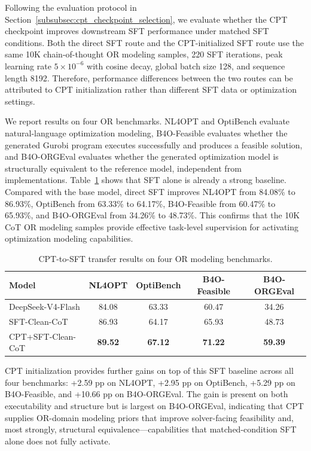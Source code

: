 Following the evaluation protocol in Section~\ref{subsubsec:cpt_checkpoint_selection}, we evaluate whether the CPT checkpoint improves downstream SFT performance under matched SFT conditions. Both the direct SFT route and the CPT-initialized SFT route use the same 10K chain-of-thought OR modeling samples, 220 SFT iterations, peak learning rate \(5\times10^{-6}\) with cosine decay, global batch size 128, and sequence length 8192. Therefore, performance differences between the two routes can be attributed to CPT initialization rather than different SFT data or optimization settings.

We report results on four OR benchmarks. NL4OPT and OptiBench evaluate natural-language optimization modeling, B4O-Feasible evaluates whether the generated Gurobi program executes successfully and produces a feasible solution, and B4O-ORGEval evaluates whether the generated optimization model is structurally equivalent to the reference model, independent from implementations. Table~\ref{tab:cpt_sft_transfer} 
shows that SFT alone is already a strong baseline. Compared with the base model, direct SFT improves NL4OPT from 84.08\% to 86.93\%, OptiBench from 63.33\% to 64.17\%, B4O-Feasible from 60.47\% to 65.93\%, and B4O-ORGEval from 34.26\% to 48.73\%. This confirms that the 10K CoT OR modeling samples provide effective task-level supervision for activating optimization modeling capabilities.

\begin{table}[t]
\centering
\small
\caption{CPT-to-SFT transfer results on four OR modeling benchmarks.}
\begin{tabular}{lcccc}
\toprule
Model & NL4OPT & OptiBench & B4O-Feasible & B4O-ORGEval \\
\midrule
DeepSeek-V4-Flash
    & 84.08 & 63.33 & 60.47 & 34.26 \\
SFT-Clean-CoT
    & 86.93 & 64.17 & 65.93 & 48.73 \\
CPT+SFT-Clean-CoT
    & \textbf{89.52} & \textbf{67.12} & \textbf{71.22} & \textbf{59.39} \\
\bottomrule
\end{tabular}

\label{tab:cpt_sft_transfer}
\end{table}


CPT initialization provides further gains on top of this SFT baseline across all four benchmarks: +2.59 pp on NL4OPT, +2.95 pp on OptiBench, +5.29 pp on B4O-Feasible, and +10.66 pp on B4O-ORGEval. The gain is present on both executability and structure but is largest on B4O-ORGEval, indicating that CPT supplies OR-domain modeling priors that improve solver-facing feasibility and, most strongly, structural equivalence---capabilities that matched-condition SFT alone does not fully activate.

